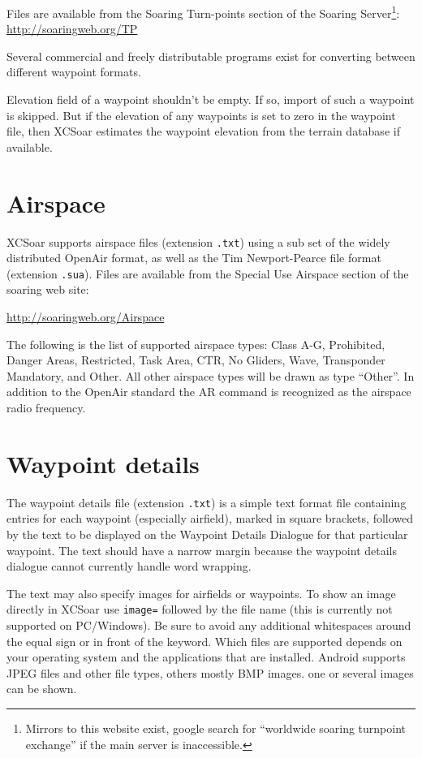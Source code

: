 Files are available from the Soaring Turn-points section of the
Soaring Server\footnote{Mirrors to this website exist, google search
for ``worldwide soaring turnpoint exchange'' if the main server is
inaccessible.}: \url{http://soaringweb.org/TP}

Several commercial and freely distributable programs exist for
converting between different waypoint formats.

Elevation field of a waypoint shouldn't be empty. If so, import of such
a waypoint is skipped.
But if the elevation of any waypoints is set to zero in the waypoint file,
then XCSoar estimates the waypoint elevation from the terrain database
if available.

\section{Airspace}

XCSoar supports airspace files (extension \verb|.txt|) using a sub set
of the widely distributed OpenAir format, as well as the Tim Newport-Pearce file
format (extension \verb|.sua|). Files are available from the
Special Use Airspace section of the soaring web site:

\url{http://soaringweb.org/Airspace}

The following is the list of supported airspace types: Class A-G, Prohibited, 
Danger Areas, Restricted, Task Area, CTR, No Gliders, Wave, Transponder 
Mandatory, and Other.  All other airspace types will be drawn as type ``Other''.
In addition to the OpenAir standard the AR command is recognized as the 
airspace radio frequency.

\section{Waypoint details}\label{sec:airfield-details}

The waypoint details file (extension \verb|.txt|) is a simple text
format file containing entries for each waypoint (especially airfield), marked in square
brackets, followed by the text to be displayed on the
Waypoint Details Dialogue for that particular waypoint.  The text should
have a narrow margin because the waypoint details dialogue cannot
currently handle word wrapping.

The text may also specify images for airfields or waypoints.  To
show an image directly in XCSoar use \verb|image=| followed by the file
name (this is currently not supported on PC/Windows).  Be sure
to avoid any additional whitespaces around the equal sign or in front of the
keyword. Which files are supported depends on your operating system and the
applications that are installed.  Android supports JPEG files and other
file types, others mostly BMP images. one or several images can be shown.

